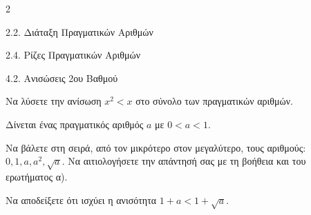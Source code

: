 \begin{ylh}{2}
    \item 2.2. Διάταξη Πραγματικών Αριθμών
    \item 2.4. Ρίζες Πραγματικών Αριθμών
    \item 4.2. Ανισώσεις 2ου Βαθμού
\end{ylh}

\begin{alist}
\item Να λύσετε την ανίσωση $x^2 < x$ στο σύνολο των πραγματικών αριθμών.
\item Δίνεται ένας πραγματικός αριθμός $a$ με $0 < a < 1$.
\begin{rlist}
\item Να βάλετε στη σειρά, από τον μικρότερο στον μεγαλύτερο, τους αριθμούς:
$0, 1, a, a^2, \sqrt{a}$.
Να αιτιολογήσετε την απάντησή σας με τη βοήθεια και του ερωτήματος α).
\item Να αποδείξετε ότι ισχύει η ανισότητα $1 + a < 1 + \sqrt{a}$.

\end{rlist}
\end{alist}

